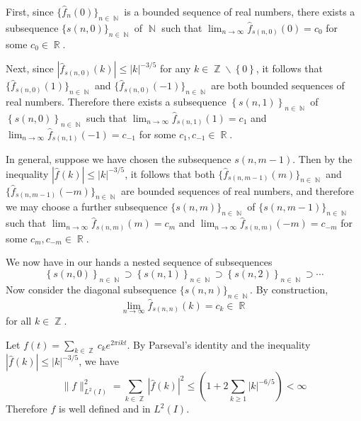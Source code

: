 \documentclass[answers]{exam}
\DeclareMathOperator{\RR}{\mathbb{R}}
\DeclareMathOperator{\ZZ}{\mathbb{Z}}
\DeclareMathOperator{\NN}{\mathbb{N}}
\begin{document}
\begin{questions}
\begin{parts}
\begin{solution}
  
  First, since $\{\hat{f}_{n}(0)\}_{n\in\NN}$ is a bounded sequence of real numbers, there exists a subsequence $\{s(n,0)\}_{n\in \NN}$ of $\NN$ such that $\lim_{n \to \infty} \hat{f}_{s(n,0)}(0)= c_{0}$ for some $c_{0}\in \RR$.

  Next, since $|\hat{f}_{s(n,0)}(k)|\leq |k|^{-3/5}$ for any $k\in \ZZ\backslash \left\{ 0 \right\}$, it follows that  $\{\hat{f}_{s(n,0)}(1)\}_{n\in\NN}$ and $\{\hat{f}_{s(n,0)}(-1)\}_{n\in\NN}$ are both bounded sequences of real numbers. Therefore there exists a subsequence $\left\{ s(n,1) \right\}_{n\in \NN}$ of  $\left\{ s(n,0) \right\}_{n\in \NN}$ such that $\lim_{n \to \infty} \hat{f}_{s(n,1)}(1) = c_{1}$ and $\lim_{n \to \infty} \hat{f}_{s(n,1)}(-1) = c_{-1}$ for some $c_{1},c_{-1}\in \RR$.
  
  In general, suppose we have chosen the subsequence $s(n,m-1)$. Then by the inequality $|\hat{f}(k)|\leq |k|^{-3/5}$, it follows that both $\{\hat{f}_{s(n,m-1)}(m)\}_{n\in\NN}$ and $\{\hat{f}_{s(n,m-1)}(-m)\}_{n\in\NN}$ are bounded sequences of real numbers, and therefore we may choose a further subsequence $\{s(n,m)\}_{n\in\NN}$ of $\{s(n,m-1)\}_{n\in\NN}$ such that 
  $\lim_{n \to \infty} \hat{f}_{s(n,m)}(m) = c_{m}$ and $\lim_{n \to \infty} \hat{f}_{s(n,m)}(-m) = c_{-m}$ for some $c_{m},c_{-m}\in \RR$.

  We now have in our hands a nested sequence of subsequences
  \begin{equation*}
    \left\{ s(n,0) \right\}_{n\in\NN}\supset  \left\{ s(n,1) \right\}_{n\in\NN}\supset \left\{ s(n,2) \right\}_{n\in\NN}\supset \cdots
  \end{equation*}
  Now consider the diagonal subsequence $\{s(n,n)\}_{n\in \NN}$. By construction,
  \begin{equation}
    \label{eq:9}
    \lim_{n\to\infty} \hat{f}_{s(n,n)}(k) =c_{k}\in \RR
  \end{equation}
  for all $k\in \ZZ$.

  Let $f(t)=\sum_{k\in\ZZ} c_{k}e^{2\pi i k t}$. By Parseval's identity and the inequality $|\hat{f}(k)|\leq |k|^{-3/5}$, we have
  \begin{equation*}
    \| f \|^{2}_{L^{2}(I)} =  \sum_{k\in\ZZ}|\hat{f}(k)|^{2} \leq  \left( 1 + 2\sum_{k\geq 1}|k|^{-6/5} \right)<\infty
  \end{equation*}
  Therefore $f$ is well defined and in $L^{2}(I)$.
  

\end{solution}
\end{parts}
\end{questions}
\end{document}
